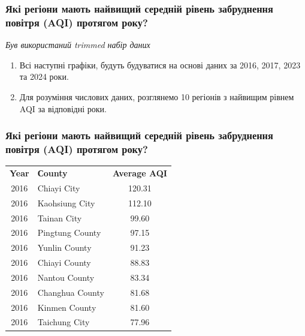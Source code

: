 \documentclass{beamer}
\begin{document}

\begin{frame}
  \frametitle{Які регіони мають найвищий середній рівень забруднення повітря (AQI) протягом року?}

  \textit{Був використаний trimmed набір даних}

  \begin{enumerate}
    \item Всі наступні графіки, будуть будуватися на основі даних за
    2016, 2017, 2023 та 2024 роки.
    \item  Для розуміння числових даних, розглянемо 10 регіонів з
    найвищим рівнем AQI за відповідні роки.
  \end{enumerate}
\end{frame}

\begin{frame}
  \frametitle{Які регіони мають найвищий середній рівень забруднення повітря (AQI) протягом року?}

  \begin{center}
    \begin{tabular}{clc}
      \textbf{Year} & \textbf{Сounty} & \textbf{Average AQI} \\
      2016 & Chiayi City     & 120.31 \\
      2016 & Kaohsiung City  & 112.10 \\
      2016 & Tainan City     & 99.60  \\
      2016 & Pingtung County & 97.15  \\
      2016 & Yunlin County   & 91.23  \\
      2016 & Chiayi County   & 88.83  \\
      2016 & Nantou County   & 83.34  \\
      2016 & Changhua County & 81.68  \\
      2016 & Kinmen County   & 81.60  \\
      2016 & Taichung City   & 77.96  \\
    \end{tabular}
  \end{center}
\end{frame}
\end{document}
